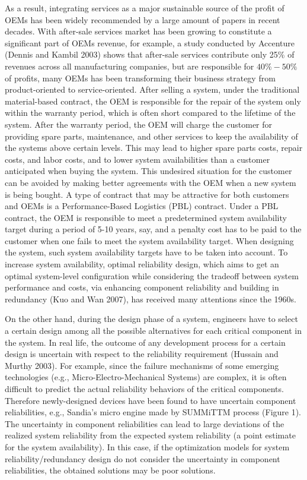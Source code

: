 \documentclass[preprint,12pt]{elsarticle}
\begin{document}
As a result, integrating services as a major sustainable source of the profit of OEMs has been widely recommended by a large amount of papers in recent decades. With after-sale services market has been growing to constitute a significant part of OEMs revenue, for example, a study conducted by Accenture (Dennis and Kambil 2003) shows that after-sale services contribute only 25\% of revenues across all manufacturing companies, but are responsible for $40\%-50\%$ of profits, many OEMs has been transforming their business strategy from product-oriented to service-oriented. After selling a system, under the traditional material-based contract, the OEM is responsible for the repair of the system only within the warranty period, which is often short compared to the lifetime of the system. After the warranty period, the OEM will charge the customer for providing spare parts, maintenance, and other services to keep the availability of the systems above certain levels. This may lead to higher spare parts costs, repair costs, and labor costs, and to lower system availabilities than a customer anticipated when buying the system. This undesired situation for the customer can be avoided by making better agreements with the OEM when a new system is being bought. A type of contract that may be attractive for both customers and OEMs is a Performance-Based Logistics (PBL) contract. Under a PBL contract, the OEM is responsible to meet a predetermined system availability target during a period of 5-10 years, say, and a penalty cost has to be paid to the customer when one fails to meet the system availability target. When designing the system, such system availability targets have to be taken into account. To increase system availability, optimal reliability design, which aims to get an optimal system-level configuration while considering the tradeoff between system performance and costs, via enhancing component reliability and building in redundancy (Kuo and Wan 2007), has received many attentions since the 1960s.

On the other hand, during the design phase of a system, engineers have to select a certain design among all the possible alternatives for each critical component in the system. In real life, the outcome of any development process for a certain design is uncertain with respect to the reliability requirement (Hussain and Murthy 2003). For example, since the failure mechanisms of some emerging technologies (e.g., Micro-Electro-Mechanical Systems) are complex, it is often difficult to predict the actual reliability behaviors of the critical components. Therefore newly-designed devices have been found to have uncertain component reliabilities, e.g., Sandia’s micro engine made by SUMMiTTM process (Figure 1). The uncertainty in component reliabilities can lead to large deviations of the realized system reliability from the expected system reliability (a point estimate for the system availability). In this case, if the optimization models for system reliability/redundancy design do not consider the uncertainty in component reliabilities, the obtained solutions may be poor solutions.
\end{document}
